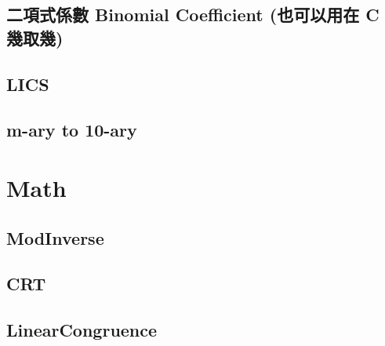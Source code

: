    \subsection{二項式係數 Binomial Coefficient (也可以用在 C 幾取幾)}
        
    \subsection{LICS}
        
    \subsection{m-ary to 10-ary}
        

\section{Math}
    \subsection{ModInverse}
        
    \subsection{CRT}
        
    \subsection{LinearCongruence}
        
